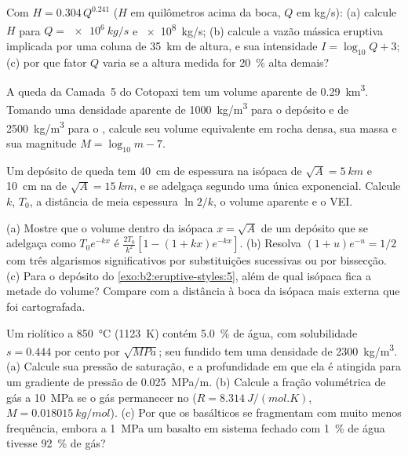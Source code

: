 \begin{exercise}[$\star$]\label{exo:b2:eruptive-styles:3}
Com $H = 0.304\,Q^{0.241}$ ($H$ em quilômetros acima da boca, $Q$ em
\unit{kg/s}): (a) calcule $H$ para $Q = \qty{e6}{kg/s}$ e \qty{e8}{kg/s};
(b) calcule a vazão mássica eruptiva implicada por uma coluna de \qty{35}{km} de altura, e sua
intensidade $I = \log_{10}Q + 3$; (c) por que fator $Q$ varia se a altura medida
for \qty{20}{\percent} alta demais?
\end{exercise}

\begin{exercise}[$\star$]\label{exo:b2:eruptive-styles:4}
A queda da Camada~5 do Cotopaxi tem um volume aparente de \qty{0.29}{km^3}. Tomando uma
densidade aparente de \qty{1000}{kg/m^3} para o depósito e de \qty{2500}{kg/m^3} para o
, calcule seu volume equivalente em rocha densa, sua massa e sua magnitude
$M = \log_{10}m - 7$.
\end{exercise}

\begin{exercise}[$\star\star$]\label{exo:b2:eruptive-styles:5}
Um depósito de queda tem \qty{40}{cm} de espessura na isópaca de $\sqrt A = \qty{5}{km}$
e \qty{10}{cm} na de $\sqrt A = \qty{15}{km}$, e se adelgaça segundo uma única
exponencial. Calcule $k$, $T_0$, a distância de meia espessura $\ln 2/k$, o volume
aparente e o VEI.
\end{exercise}

\begin{exercise}[$\star\star$]\label{exo:b2:eruptive-styles:6}
(a) Mostre que o volume dentro da isópaca $x = \sqrt A$ de um depósito que se adelgaça
como $T_0e^{-kx}$ é $\frac{2T_0}{k^2}[1 - (1 + kx)e^{-kx}]$. (b) Resolva $(1 + u)e^{-u} =
1/2$ com três algarismos significativos por substituições sucessivas ou por bissecção. (c) Para
o depósito do \cref{exo:b2:eruptive-styles:5}, além de qual isópaca fica a metade do volume? Compare
com a distância à boca da isópaca mais externa que foi cartografada.
\end{exercise}

\begin{exercise}[$\star\star$]\label{exo:b2:eruptive-styles:7}
Um  riolítico a \qty{850}{\celsius} (\qty{1123}{K}) contém
\qty{5.0}{\percent} de água, com solubilidade $s = 0.444$ por cento por
$\sqrt{\unit{MPa}}$; seu fundido tem uma densidade de \qty{2300}{kg/m^3}. (a) Calcule sua
pressão de saturação, e a profundidade em que ela é atingida para um gradiente de
pressão de \qty{0.025}{MPa/m}. (b) Calcule a fração volumétrica de gás a
\qty{10}{MPa} se o gás permanecer no  ($R = \qty{8.314}{J/(mol.K)}$, $M =
\qty{0.018015}{kg/mol}$). (c) Por que os  basálticos se fragmentam com muito menos
frequência, embora a \qty{1}{MPa} um basalto em sistema fechado com \qty{1}{\percent} de
água tivesse \qty{92}{\percent} de gás?
\end{exercise}

